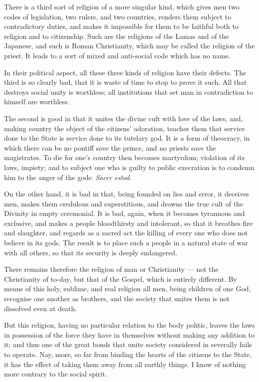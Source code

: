 \documentclass[12pt]{report}
\begin{document}
There is a third sort of religion of a more singular kind, which gives men two codes of legislation, two rulers, and two countries, renders them subject to contradictory duties, and makes it impossible for them to be faithful both to religion and to citizenship. Such are the religions of the Lamas and of the Japanese, and such is Roman Christianity, which may be called the religion of the priest. It leads to a sort of mixed and anti-social code which has no name.

In their political aspect, all these three kinds of religion have their defects. The third is so clearly bad, that it is waste of time to stop to prove it such. All that destroys social unity is worthless; all institutions that set man in contradiction to himself are worthless.

The second is good in that it unites the divine cult with love of the laws, and, making country the object of the citizens' adoration, teaches them that service done to the State is service done to its tutelary god. It is a form of theocracy, in which there can be no pontiff save the prince, and no priests save the magistrates. To die for one's country then becomes martyrdom; violation of its laws, impiety; and to subject one who is guilty to public execration is to condemn him to the anger of the gods: \textit{Sacer estod}.

On the other hand, it is bad in that, being founded on lies and error, it deceives men, makes them credulous and superstitious, and drowns the true cult of the Divinity in empty ceremonial. It is bad, again, when it becomes tyrannous and exclusive, and makes a people bloodthirsty and intolerant, so that it breathes fire and slaughter, and regards as a sacred act the killing of every one who does not believe in its gods. The result is to place such a people in a natural state of war with all others, so that its security is deeply endangered.

There remains therefore the religion of man or Christianity — not the Christianity of to-day, but that of the Gospel, which is entirely different. By means of this holy, sublime, and real religion all men, being children of one God, recognise one another as brothers, and the society that unites them is not dissolved even at death.

But this religion, having no particular relation to the body politic, leaves the laws in possession of the force they have in themselves without making any addition to it; and thus one of the great bonds that unite society considered in severally fails to operate. Nay, more, so far from binding the hearts of the citizens to the State, it has the effect of taking them away from all earthly things. I know of nothing more contrary to the social spirit.
\end{document}
